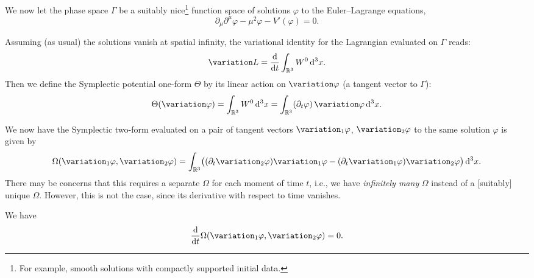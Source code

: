 We now let the phase space $\Gamma$ be a suitably nice\footnote{For
example, smooth solutions with compactly supported initial data.} function space of
solutions $\varphi$ to the Euler--Lagrange equations,
\begin{equation}
\partial_{\mu}\partial^{\mu}\varphi - \mu^{2}\varphi - V'(\varphi)=0.
\end{equation}

Assuming (as usual) the solutions vanish at spatial infinity, the
variational identity for the Lagrangian evaluated on $\Gamma$ reads:
\begin{equation}
\variation L = \frac{\D}{\D t}\int_{\RR^{3}}W^{0}\,\D^{3}x.
\end{equation}
Then we define the Symplectic potential one-form $\Theta$ by its linear
action on $\variation\varphi$ (a tangent vector to $\Gamma$):
\begin{equation}
\Theta(\variation\varphi) = \int_{\RR^{3}}W^{0}\,\D^{3}x =  \int_{\RR^{3}}(\partial_{t}\varphi)\,\variation\varphi\,\D^{3}x.
\end{equation}

We now have the Symplectic two-form evaluated on a pair of tangent
vectors $\variation_{1}\varphi$, $\variation_{2}\varphi$ to the same
solution $\varphi$ is given by
\begin{equation}\label{eq:classical-field-theory:scalar-field:symplectic-structure:explicit-defn}
\Omega(\variation_{1}\varphi, \variation_{2}\varphi)
=\int_{\RR^{3}}\bigl((\partial_{t}\variation_{2}\varphi)\variation_{1}\varphi
-(\partial_{t}\variation_{1}\varphi)\variation_{2}\varphi\bigr)\,\D^{3}x.
\end{equation}
There may be concerns that this requires a separate $\Omega$ for each
moment of time $t$, i.e., we have \emph{infinitely many} $\Omega$
instead of a [suitably] unique $\Omega$. However, this is not the case,
since its derivative with respect to time vanishes.

\begin{proposition}
  We have
  \begin{equation}
\frac{\D}{\D t}\Omega(\variation_{1}\varphi, \variation_{2}\varphi)=0.
  \end{equation}
\end{proposition}

